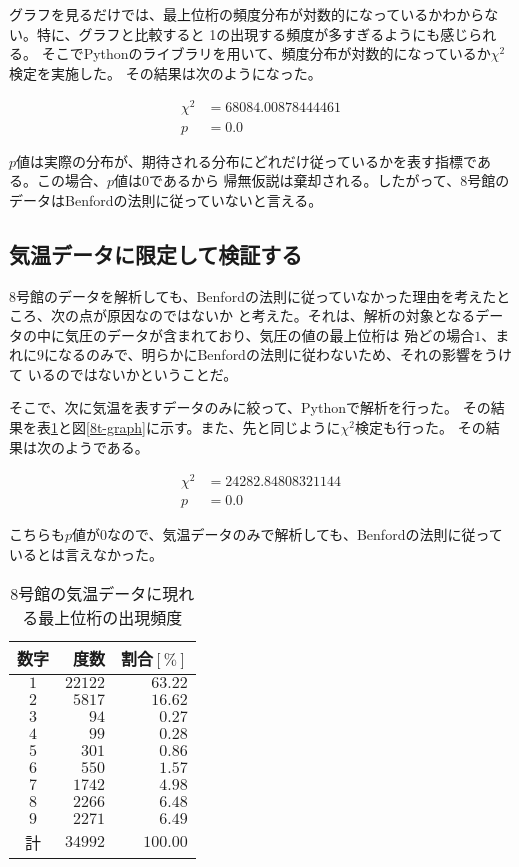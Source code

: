 \documentclass[jafontsize=9pt,twocolumn]{jlreq}
\begin{document}
グラフを見るだけでは、最上位桁の頻度分布が対数的になっているかわからない。特に、グラフと比較すると
1の出現する頻度が多すぎるようにも感じられる。
そこでPythonのライブラリを用いて、頻度分布が対数的になっているか$\chi^2$検定を実施した。
その結果は次のようになった。

\begin{align*}
\chi^2&=68084.00878444461\\ p&=0.0
\end{align*}

$p$値は実際の分布が、期待される分布にどれだけ従っているかを表す指標である。この場合、$p$値は$0$であるから
帰無仮説は棄却される。したがって、8号館のデータはBenfordの法則に従っていないと言える。

\subsection{気温データに限定して検証する}

8号館のデータを解析しても、Benfordの法則に従っていなかった理由を考えたところ、次の点が原因なのではないか
と考えた。それは、解析の対象となるデータの中に気圧のデータが含まれており、気圧の値の最上位桁は
殆どの場合$1$、まれに$9$になるのみで、明らかにBenfordの法則に従わないため、それの影響をうけて
いるのではないかということだ。

そこで、次に気温を表すデータのみに絞って、Pythonで解析を行った。
その結果を表\ref{8t-tbl}と図\ref{8t-graph}に示す。また、先と同じように$\chi^2$検定も行った。
その結果は次のようである。

\begin{align*}
\chi^2&=24282.84808321144\\ p&=0.0
\end{align*}

こちらも$p$値が$0$なので、気温データのみで解析しても、Benfordの法則に従っているとは言えなかった。


\begin{table}[b]
\caption{8号館の気温データに現れる最上位桁の出現頻度}
\label{8t-tbl}
\centering
\begin{tabular}{c||rr}
\hline
数字&度数&割合$[\%]$\\
\hline\hline
$1$&$22122$&$63.22$\\
$2$&$5817$&$16.62$\\
$3$&$94$&$0.27$\\
$4$&$99$&$0.28$\\
$5$&$301$&$0.86$\\
$6$&$550$&$1.57$\\
$7$&$1742$&$4.98$\\
$8$&$2266$&$6.48$\\
$9$&$2271$&$6.49$\\
\hline
計&$34992$&$100.00$\\
\hline
\end{tabular}
\end{table}
\end{document}
